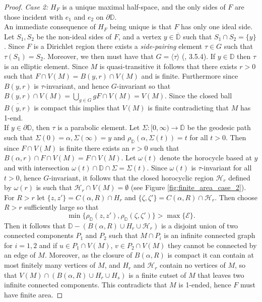 \documentclass{article}
\numberwithin{equation}{section}
\theoremstyle{definition}
\theoremstyle{remark}
\begin{document}
\begin{proof}
 \textit{Case 2:} $H_F$ is a unique maximal half-space, and the only sides of $F$ are those incident with $e_1$ and $e_2$ on $\partial\mathbb{D}$.\\
  An immediate consequence of $H_F$ being unique is that $F$ has only one ideal side.
Let $S_1,S_2$ be the non-ideal sides of $F$, and a vertex $y\in\overline{\mathbb{D}}$ such that $S_1\cap S_2=\{y\}$. Since $F$ is a Dirichlet region there exists a \textit{side-pairing} element $\tau\in G$ such that $\tau(S_1)=S_2$. Moreover, we then must have that $G=\langle\tau\rangle$ (\cite{Fuchsian_Katok}, 3.5.4). If $y\in\mathbb{D}$ then $\tau$ is an elliptic element. Since $M$ is quasi-transitive it follows that there exists $r>0$ such that $F\cap V(M)=B(y,r)\cap V(M)$ and is finite. Furthermore since $B(y,r)$ is $\tau$-invariant,
 and hence $G$-invariant so that $B(y,r)\cap V(M)=\bigcup_{g\in G}gF\cap V(M)=V(M)$. Since the closed ball
$\overline{B(y,r)}$ is compact this implies that $V(M)$ is finite contradicting that $M$ has 1-end.\\
If $y\in \partial \mathbb{D}$, then $\tau$ is a parabolic element. Let $\Sigma:[0,\infty)\rightarrow\overline{\mathbb{D}}$ be the geodesic path such that $\Sigma(0)=\alpha,\Sigma(\infty)=y$ and $\rho_\mathbb{D}(\alpha,\Sigma(t))=t$ for all $t>0$. Then since $F\cap V(M)$ is finite there exists an $r>0$ such that $B(\alpha,r)\cap F\cap V(M)=F\cap V(M)$. Let $\omega(t)$ denote the horocycle based at $y$ and with intersection $\omega(t)\cap\mathbb{D}\cap \Sigma=\Sigma(t)$. Since $\omega(t)$ is $\tau$-invariant for all $t>0$, hence $G$-invariant, it follows that the closed horocyclic region $\mathcal{H}_r$ defined by $\omega(r)$ is such that $\mathcal{H}_r\cap V(M)=\emptyset$ (see Figure \ref{fig:finite_area_case_2}). For $R>r$ let $\{z,z'\}=C(\alpha,R)\cap H_r$ and $\{\zeta,\zeta'\}=C(\alpha,R)\cap \mathcal{H}_r$. Then choose $R>r$ sufficiently large so that 
$$\min\{\rho_\mathbb{D}(z,z'),\rho_\mathbb{D}(\zeta,\zeta')\}>\max\{\mathcal{E}\}.$$
 Then it follows that $\mathbb{D}-(B(\alpha,R)\cup H_r\cup \mathcal{H}_r)$ is a disjoint union of two connected components $P_1$ and $P_2$ such that $M\cap P_i$ is an infinite connected graph for $i=1,2$ and if $u\in P_1\cap V(M)$, $v\in P_2\cap V(M)$ they cannot be connected by an edge of $M$. Moreover, as the closure of $B(\alpha,R)$ is compact it can contain at most finitely many vertices of $M$, and $H_r$ and $\mathcal{H}_r$ contain no vertices of $M$, so that $V(M)\cap(B(\alpha,R)\cup H_r\cup H_s)$ is a finite cutset of $M$ that leaves two infinite connected components. This contradicts that $M$ is 1-ended, hence $F$ must have finite area.


\end{proof}
\end{document}
